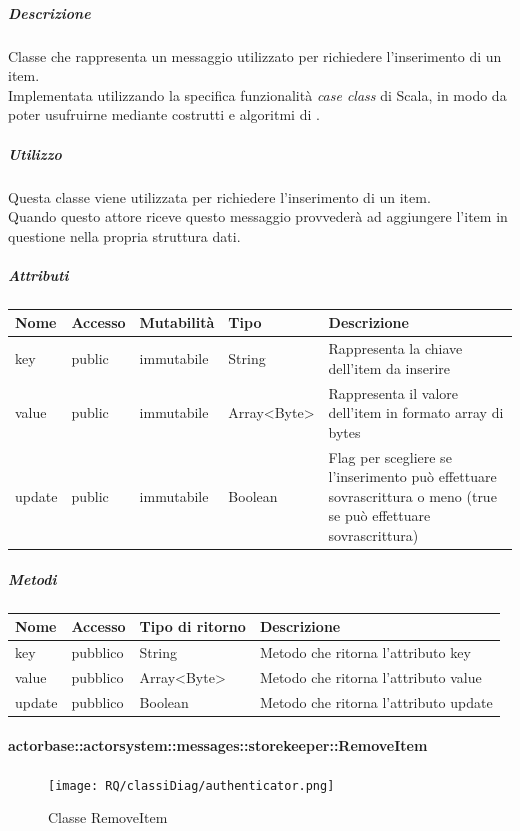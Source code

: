 \documentclass{scalatekids-article}
\begin{document}
\subparagraph{Descrizione}
Classe che rappresenta un messaggio utilizzato per richiedere l'inserimento di
un item.\\Implementata utilizzando la specifica funzionalità \textit{case class} di Scala,
in modo da poter usufruirne mediante costrutti e algoritmi di
.

\subparagraph{Utilizzo}
Questa classe viene utilizzata per richiedere l'inserimento di un item.\\Quando questo attore riceve questo messaggio provvederà ad aggiungere l'item in
questione nella propria struttura dati.

\subparagraph{Attributi}
\begin{tabular}{| p{2cm} | p{1.5cm} | p{2cm} | p{3cm} | p{8.5cm} |}
  \hline
  Nome & Accesso & Mutabilità & Tipo & Descrizione\\
  \hline
  key & public & immutabile & String & Rappresenta la chiave dell'item da inserire\\
  \hline
  value & public & immutabile & Array<Byte> & Rappresenta il valore dell'item in formato array di bytes\\
  \hline
  update & public & immutabile & Boolean & Flag per scegliere se l'inserimento può effettuare sovrascrittura o meno (true se può effettuare sovrascrittura)\\
  \hline
\end{tabular}

\subparagraph{Metodi}
\begin{tabular}{| l | l | l | l |}
  \hline
  Nome & Accesso & Tipo di ritorno & Descrizione\\
  \hline
  key & pubblico & String & Metodo che ritorna l'attributo key\\
  \hline
  value & pubblico & Array<Byte> & Metodo che ritorna l'attributo value\\
  \hline
  update & pubblico & Boolean & Metodo che ritorna l'attributo update\\
  \hline
\end{tabular}

\paragraph{actorbase::actorsystem::messages::storekeeper::RemoveItem}
\label{sec:actorbase::actorsystem::messages::storekeeper::RemoveItem}

\begin{figure}[H]
  \begin{center}
    \texttt{[image: RQ/classiDiag/authenticator.png]}
    \caption{Classe RemoveItem}
  \end{center}
\end{figure}
\end{document}
